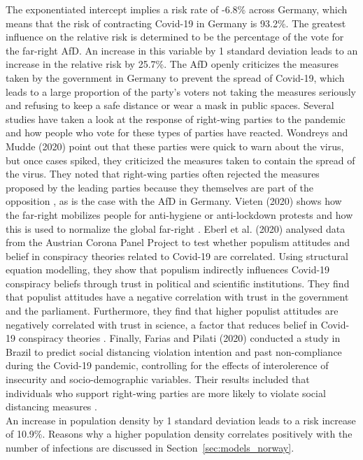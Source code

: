 The exponentiated intercept implies a risk rate of -6.8\% across Germany, which means that the risk of contracting Covid-19 in Germany is 93.2\%.  The greatest influence on the relative risk is determined to be the percentage of the vote for the far-right AfD. An increase in this variable by 1 standard deviation leads to an increase in the relative risk by 25.7\%. The AfD openly criticizes the measures taken by the government in Germany to prevent the spread of Covid-19, which leads to a large proportion of the party's voters not taking the measures seriously and refusing to keep a safe distance or wear a mask in public spaces. Several studies have taken a look at the response of right-wing parties to the pandemic and how people who vote for these types of parties have reacted. Wondreys and Mudde (2020) point out that these parties were quick to warn about the virus, but once cases spiked, they criticized the measures taken to contain the spread of the virus. They noted that right-wing parties often rejected the measures proposed by the leading parties because they themselves are part of the opposition \autocite[][]{wondreys2020victims}, as is the case with the AfD in Germany. Vieten (2020) shows how the far-right mobilizes people for anti-hygiene or anti-lockdown protests and how this is used to normalize the global far-right \autocite[][]{vieten2020new}. Eberl et al. (2020) analysed data from the Austrian Corona Panel Project to test whether populism attitudes and belief in conspiracy theories related to Covid-19 are correlated. Using structural equation modelling, they show that populism indirectly influences Covid-19 conspiracy beliefs through trust in political and scientific institutions. They find that populist attitudes have a negative correlation with trust in the government and the parliament. Furthermore, they find that higher populist attitudes are negatively correlated with trust in science, a factor that reduces belief in Covid-19 conspiracy theories \autocite[][]{eberl2020populism}. Finally, Farias and Pilati (2020) conducted a study in Brazil to predict social distancing violation intention and past non-compliance during the Covid-19 pandemic, controlling for the effects of interolerence of insecurity and socio-demographic variables. Their results included that individuals who support right-wing parties are more likely to violate social distancing measures \autocite[][]{farias2020violating}. \\
An increase in population density by 1 standard deviation leads to a risk increase of 10.9\%. Reasons why a higher population density correlates positively with the number of infections are discussed in Section~\ref{sec:models_norway}. \\
